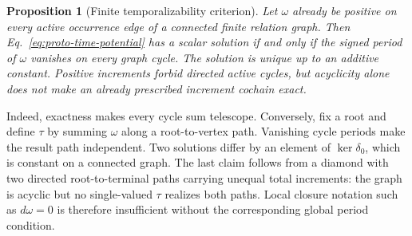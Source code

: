 \documentclass[11pt]{article}
\newtheorem{proposition}{Proposition}
\begin{document}
\begin{proposition}[Finite temporalizability criterion]
Let $\omega$ already be positive on every active occurrence edge of a
connected finite relation graph.  Then Eq.~\eqref{eq:proto-time-potential}
has a scalar solution if and only if the signed period of $\omega$ vanishes on
every graph cycle.  The solution is unique up to an additive constant.
Positive increments forbid directed active cycles, but acyclicity alone does
not make an already prescribed increment cochain exact.
\end{proposition}

Indeed, exactness makes every cycle sum telescope.  Conversely, fix a root
and define $\tau$ by summing $\omega$ along a root-to-vertex path.  Vanishing
cycle periods make the result path independent.  Two solutions differ by an
element of $\ker\delta_0$, which is constant on a connected graph.  The last
claim follows from a diamond with two directed root-to-terminal paths carrying
unequal total increments: the graph is acyclic but no single-valued $\tau$
realizes both paths.  Local closure notation such as $d\omega=0$ is therefore
insufficient without the corresponding global period condition.
\end{document}
